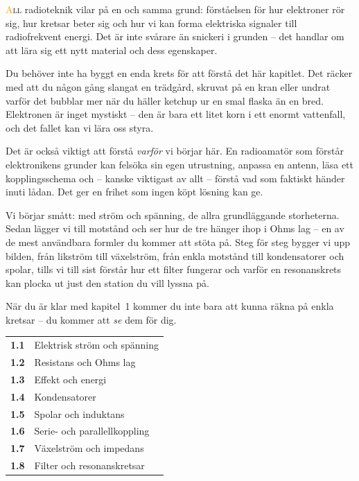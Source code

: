 \documentclass[a4paper,11pt,twoside]{book}
\begin{document}
\lettrine[lines=3, loversize=0.1]{\textcolor{orange}{A}}{ll} radioteknik vilar på en och samma grund: förståelsen för hur elektroner rör sig, hur kretsar beter sig och hur vi kan forma elektriska signaler till radiofrekvent energi. Det är inte svårare än snickeri i grunden – det handlar om att lära sig ett nytt material och dess egenskaper.

Du behöver inte ha byggt en enda krets för att förstå det här kapitlet. Det räcker med att du någon gång slangat en trädgård, skruvat på en kran eller undrat varför det bubblar mer när du häller ketchup ur en smal flaska än en bred. Elektronen är inget mystiskt – den är bara ett litet korn i ett enormt vattenfall, och det fallet kan vi lära oss styra.

Det är också viktigt att förstå \emph{varför} vi börjar här. En radioamatör som förstår elektronikens grunder kan felsöka sin egen utrustning, anpassa en antenn, läsa ett kopplingsschema och – kanske viktigast av allt – förstå vad som faktiskt händer inuti lådan. Det ger en frihet som ingen köpt lösning kan ge.

Vi börjar smått: med ström och spänning, de allra grundläggande storheterna. Sedan lägger vi till motstånd och ser hur de tre hänger ihop i Ohms lag – en av de mest användbara formler du kommer att stöta på. Steg för steg bygger vi upp bilden, från likström till växelström, från enkla motstånd till kondensatorer och spolar, tills vi till sist förstår hur ett filter fungerar och varför en resonanskrets kan plocka ut just den station du vill lyssna på.

När du är klar med kapitel~1 kommer du inte bara att kunna räkna på enkla kretsar – du kommer att \emph{se} dem för dig.

\begin{bluebox}[title={Vad du lär dig i kapitel 1}]
\begin{tabular}{@{}ll@{}}
  \textbf{1.1} & Elektrisk ström och spänning \\
  \textbf{1.2} & Resistans och Ohms lag \\
  \textbf{1.3} & Effekt och energi \\
  \textbf{1.4} & Kondensatorer \\
  \textbf{1.5} & Spolar och induktans \\
  \textbf{1.6} & Serie- och parallellkoppling \\
  \textbf{1.7} & Växelström och impedans \\
  \textbf{1.8} & Filter och resonanskretsar \\
\end{tabular}
\end{bluebox}
\end{document}
